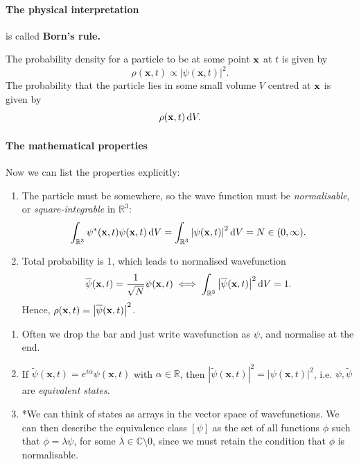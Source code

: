 \documentclass[a4paper]{article}
\begin{document}
\paragraph{The physical interpretation} is called \textbf{Born's rule.}

\begin{proposition}
    The probability density for a particle to be at some point \( \vb x \) at \( t \) is given by 
    \[
        \rho(\mathbf{x},t) \propto \left| \psi(\mathbf{x},t) \right| ^2. 
    \]
    The probability that the particle lies in some small volume \( V \) centred at \( \vb x \) is given by 
    \[
        \rho(\vb x, t) \,\mathrm{d}{V}.
    \]
\end{proposition}

\paragraph{The mathematical properties} Now we can list the properties explicitly:
\begin{enumerate}
    \item The particle must be somewhere, so the wave function must be \textit{normalisable}, or \textit{square-integrable} in \( \mathbb R^3 \):
    \[
        \int_{\mathbb R^3} \psi^*(\vb x, t) \psi(\vb x, t) \,\mathrm{d}{V} = \int_{\mathbb R^3} \abs{\psi(\vb x, t)}^2 \,\mathrm{d}{V} = N \in (0, \infty).
    \]
    \item Total probability is 1, which leads to normalised wavefunction
    \[
        \overline{\psi}(\vb x, t) = \frac{1}{\sqrt{N}} \psi(\vb x, t) \iff \int_{\mathbb R^3} \abs{\overline{\psi}(\vb x, t)}^2 \,\mathrm{d}{V} = 1.
    \]
    Hence, \( \rho(\vb x,t) = \abs{\overline{\psi}(\vb x,t)}^2 \).
\end{enumerate}

\begin{note}
    \begin{enumerate}
        \item Often we drop the bar and just write wavefunction as $ \psi $, and normalise at the end. 
        \item If $ \widetilde{\psi}(\mathbf{x},t) = e^{i\alpha} \psi(\mathbf{x},t) $ with $ \alpha\in \mathbb{R} $, then $ \left| \widetilde{\psi}(\mathbf{x},t) \right|^2 = \left| \psi(\mathbf{x},t) \right| ^2  $, i.e. $ \psi,\widetilde{\psi} $ are \textit{equivalent states}. 
        \item *We can think of states as arrays in the vector space of wavefunctions.
        We can then describe the equivalence class \( [\psi] \) as the set of all functions \( \phi \) such that \( \phi = \lambda \psi \), for some \( \lambda \in \mathbb C \setminus \qty{0} \), since we must retain the condition that \( \phi \) is normalisable.
    \end{enumerate}
\end{note}
\end{document}
